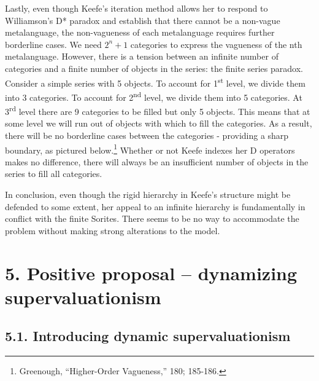 Lastly, even though Keefe's iteration method allows her to respond to
Williamson's D* paradox and establish that there cannot be a non-vague
metalanguage, the non-vagueness of each metalanguage requires further
borderline cases. We need \(2^{n} + 1\) categories to express the
vagueness of the nth metalanguage. However, there is a tension between
an infinite number of categories and a finite number of objects in the
series: the finite series paradox. Consider a simple series with 5
objects. To account for 1\textsuperscript{st} level, we divide them into
3 categories. To account for 2\textsuperscript{nd} level, we divide them
into 5 categories. At 3\textsuperscript{rd} level there are 9 categories
to be filled but only 5 objects. This means that at some level we will
run out of objects with which to fill the categories. As a result, there
will be no borderline cases between the categories - providing a sharp
boundary, as pictured below.\footnote{Greenough, ``Higher-Order
  Vagueness,'' 180; 185-186.} Whether or not Keefe indexes her D
operators makes no difference, there will always be an insufficient
number of objects in the series to fill all categories.

\begin{center}
  \end{center}
In conclusion, even though the rigid hierarchy in Keefe's structure
might be defended to some extent, her appeal to an infinite hierarchy is
fundamentally in conflict with the finite Sorites. There seems to be no
way to accommodate the problem without making strong alterations to the
model.

\section{5. Positive proposal -- dynamizing supervaluationism}

\subsection{5.1. Introducing dynamic supervaluationism}

